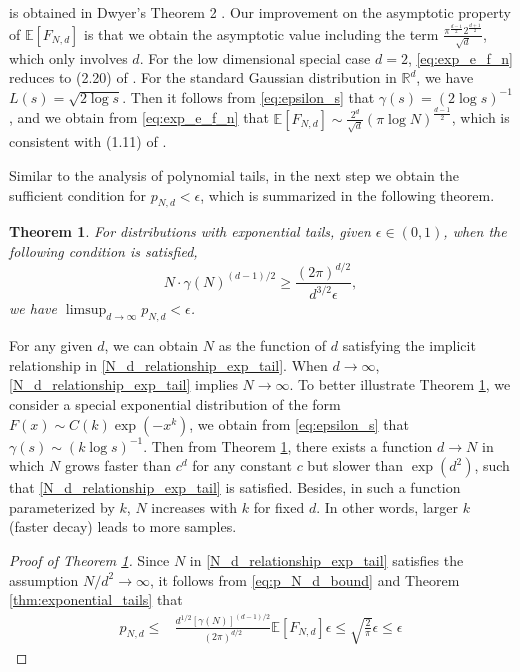 \documentclass[conference,a4paper]{IEEEtran}
\def\E{\mathbb{E}}
\newtheorem{theorem}{Theorem}
\begin{document}
 is obtained in Dwyer's Theorem 2 \cite{dwyer1991convex}.
 Our improvement on the asymptotic property of $\E[F_{N,d}]$ is that
 we obtain the asymptotic value including the term $\frac{\pi^{\frac{d-1}{2}} 2^{\frac{d+1}{2}}}{\sqrt{d}}$, which only involves $d$.
 For the low dimensional special case $d=2$, \eqref{eq:exp_e_f_n} reduces to (2.20) of \cite{carnal1970konvexe}.
 For the standard Gaussian distribution in $\mathbb{R}^d$, we have $L(s)=\sqrt{2\log s}$.
 Then it follows from \eqref{eq:epsilon_s} that $\gamma(s) = (2\log s)^{-1}$, and we obtain from \eqref{eq:exp_e_f_n}
 that $\E[F_{N,d}]\sim \frac{2^d}{\sqrt{d}}(\pi \log N)^{\frac{d-1}{2}}$,
 which is consistent with (1.11) of \cite{raynaud1970enveloppe}.



Similar to the analysis of polynomial tails, in the next step we obtain the
sufficient condition for $p_{N,d} < \epsilon$,
which is summarized in the following theorem.
\begin{theorem}\label{thm:exp_tails_sample}
  For distributions with exponential tails, given $\epsilon \in (0,1)$, when the following condition is satisfied,
  \begin{equation}\label{N_d_relationship_exp_tail}
    N\cdot \gamma(N)^{(d-1)/2} \geq \frac{(2\pi)^{d/2} }{d^{3/2} \epsilon},
  \end{equation}
  we have $ \limsup_{d\to\infty} p_{N,d} < \epsilon$.
\end{theorem}
For any given $d$, we can obtain $N$ as the function of $d$ satisfying the implicit relationship in \eqref{N_d_relationship_exp_tail}.
When $d\to \infty$, \eqref{N_d_relationship_exp_tail} implies $N\to \infty$.
To better illustrate Theorem \ref{thm:exp_tails_sample},
we consider a special exponential distribution of the form $F(x) \sim C(k)\exp(-x^k)$, we obtain from \eqref{eq:epsilon_s}
that $\gamma(s) \sim (k\log s)^{-1}$.
Then from Theorem \ref{thm:exp_tails_sample},
there exists
a function $d \to N$ in which $N$ grows faster than $c^d$ for any constant $c$ but slower than $\exp(d^2)$,
such that \eqref{N_d_relationship_exp_tail} is satisfied.
Besides, in such a function parameterized by $k$, $N$ increases with $k$ for fixed $d$.
In other words, larger $k$ (faster decay) leads to more samples.
\begin{proof}[Proof of Theorem \ref{thm:exp_tails_sample}]
     Since $N$ in \eqref{N_d_relationship_exp_tail} satisfies the assumption $N/d^2 \to \infty$,
     it follows from \eqref{eq:p_N_d_bound} and Theorem \ref{thm:exponential_tails} that
     \begin{align*}
     p_{N,d} \leq &\frac{d^{1/2}[\gamma(N)]^{(d-1)/2}}{(2\pi)^{d/2}}
     \E[F_{N,d}]\epsilon
     \leq \sqrt{\frac{2}{\pi}}\epsilon \leq \epsilon
     \end{align*}
\end{proof}
\end{document}
